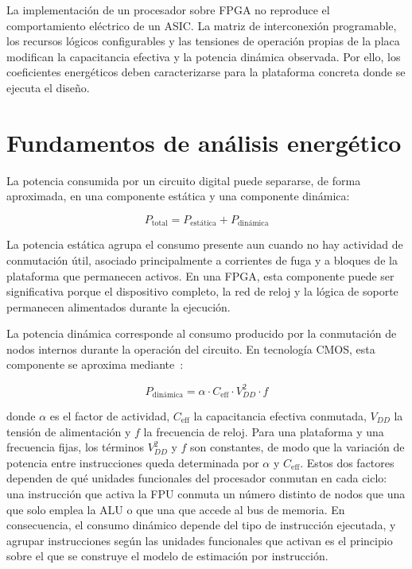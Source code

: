 La implementación de un procesador sobre FPGA no reproduce el comportamiento
eléctrico de un ASIC. La matriz de interconexión programable, los recursos
lógicos configurables y las tensiones de operación propias de la placa modifican
la capacitancia efectiva y la potencia dinámica observada. Por ello, los
coeficientes energéticos deben caracterizarse para la plataforma concreta donde
se ejecuta el diseño.

\section{Fundamentos de análisis energético}
\label{sec:consumo}

La potencia consumida por un circuito digital puede separarse, de forma
aproximada, en una componente estática y una componente dinámica:

\begin{equation}
    P_{\text{total}} = P_{\text{estática}} + P_{\text{dinámica}}
    \label{eq:potencia_total}
\end{equation}

La potencia estática agrupa el consumo presente aun cuando no hay actividad de
conmutación útil, asociado principalmente a corrientes de fuga y a bloques de la
plataforma que permanecen activos. En una FPGA, esta componente puede ser
significativa porque el dispositivo completo, la red de reloj y la lógica de
soporte permanecen alimentados durante la ejecución.

La potencia dinámica corresponde al consumo producido por la conmutación de
nodos internos durante la operación del circuito. En tecnología CMOS, esta
componente se aproxima mediante~\cite{tiwari1994power}:

\begin{equation}
    P_{\text{dinámica}} = \alpha \cdot C_{\text{eff}} \cdot V_{DD}^2 \cdot f
    \label{eq:dinamica}
\end{equation}

donde $\alpha$ es el factor de actividad, $C_{\text{eff}}$ la capacitancia
efectiva conmutada, $V_{DD}$ la tensión de alimentación y $f$ la frecuencia de
reloj. Para una plataforma y una frecuencia fijas, los términos $V_{DD}^2$ y
$f$ son constantes, de modo que la variación de potencia entre instrucciones
queda determinada por $\alpha$ y $C_{\text{eff}}$. Estos dos factores dependen
de qué unidades funcionales del procesador conmutan en cada ciclo: una
instrucción que activa la FPU conmuta un número distinto de nodos que una que
solo emplea la ALU o que una que accede al bus de memoria. En consecuencia, el
consumo dinámico depende del tipo de instrucción ejecutada, y agrupar
instrucciones según las unidades funcionales que activan es el principio sobre
el que se construye el modelo de estimación por instrucción.

